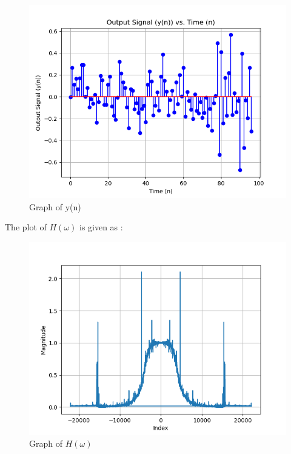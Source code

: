 \documentclass[journal,12pt,twocolumn]{IEEEtran}
\theoremstyle{remark}
\begin{document}
\begin{figure}[!h] 
\centering
\includegraphics[width=\columnwidth]{figs/y(n).png}
\caption{Graph of y(n)}
\end{figure}
\newpage

The plot of $H(\omega)$ is given as :
\begin{figure}[!h] 
\centering
\includegraphics[width=\columnwidth]{figs/H(z).png}
\caption{Graph of $H(\omega)$}
\end{figure}
\end{document}
